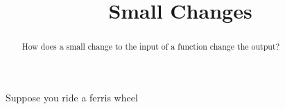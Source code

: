 \documentclass{ximera}
\title{Small Changes}
\begin{document}
\begin{abstract}
How does a small change to the input of a function change the output?
\end{abstract}
\maketitle


Suppose  you ride a ferris wheel
\end{document}

